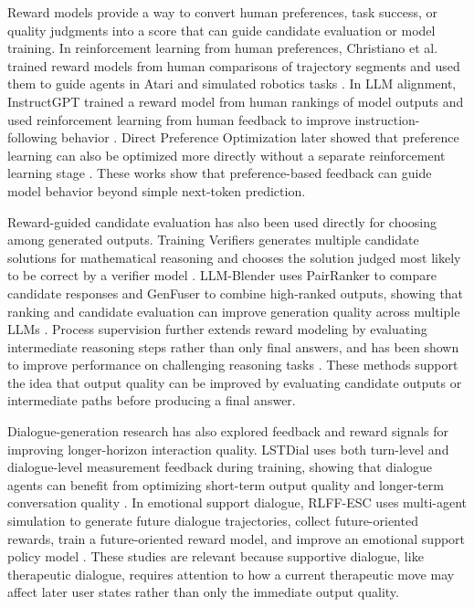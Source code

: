 Reward models provide a way to convert human preferences, task success, or quality judgments into a score that can guide candidate evaluation or model training. In reinforcement learning from human preferences, Christiano et al. trained reward models from human comparisons of trajectory segments and used them to guide agents in Atari and simulated robotics tasks \cite{christiano2017deep}. In LLM alignment, InstructGPT trained a reward model from human rankings of model outputs and used reinforcement learning from human feedback to improve instruction-following behavior \cite{ouyang2022training}. Direct Preference Optimization later showed that preference learning can also be optimized more directly without a separate reinforcement learning stage \cite{rafailov2023direct}. These works show that preference-based feedback can guide model behavior beyond simple next-token prediction.

Reward-guided candidate evaluation has also been used directly for choosing among generated outputs. Training Verifiers generates multiple candidate solutions for mathematical reasoning and chooses the solution judged most likely to be correct by a verifier model \cite{cobbe2021training}. LLM-Blender uses PairRanker to compare candidate responses and GenFuser to combine high-ranked outputs, showing that ranking and candidate evaluation can improve generation quality across multiple LLMs \cite{jiang2023llmblender}. Process supervision further extends reward modeling by evaluating intermediate reasoning steps rather than only final answers, and has been shown to improve performance on challenging reasoning tasks \cite{lightman2023lets}. These methods support the idea that output quality can be improved by evaluating candidate outputs or intermediate paths before producing a final answer.

Dialogue-generation research has also explored feedback and reward signals for improving longer-horizon interaction quality. LSTDial uses both turn-level and dialogue-level measurement feedback during training, showing that dialogue agents can benefit from optimizing short-term output quality and longer-term conversation quality \cite{ye2024lstdial}. In emotional support dialogue, RLFF-ESC uses multi-agent simulation to generate future dialogue trajectories, collect future-oriented rewards, train a future-oriented reward model, and improve an emotional support policy model \cite{yang2025rlffesc}. These studies are relevant because supportive dialogue, like therapeutic dialogue, requires attention to how a current therapeutic move may affect later user states rather than only the immediate output quality.


